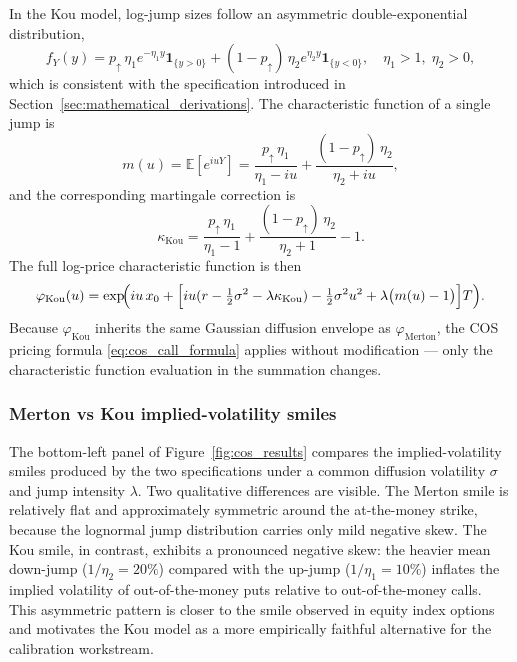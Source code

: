 \documentclass[12pt]{article}
\begin{document}
In the Kou model, log-jump sizes follow an asymmetric
double-exponential distribution,
\begin{equation}
  f_Y(y) = p_{\uparrow}\,\eta_1 e^{-\eta_1 y}\mathbf{1}_{\{y > 0\}}
           + (1-p_{\uparrow})\,\eta_2 e^{\eta_2 y}\mathbf{1}_{\{y < 0\}},
  \quad \eta_1 > 1,\; \eta_2 > 0,
\end{equation}
which is consistent with the specification introduced in
Section~\ref{sec:mathematical_derivations}. The characteristic function
of a single jump is
\begin{equation}
  m(u) = \mathbb{E}[e^{i u Y}]
       = \frac{p_{\uparrow}\,\eta_1}{\eta_1 - i u}
         + \frac{(1-p_{\uparrow})\,\eta_2}{\eta_2 + i u},
\end{equation}
and the corresponding martingale correction is
\begin{equation}
  \kappa_{\text{Kou}} = \frac{p_{\uparrow}\,\eta_1}{\eta_1-1}
        + \frac{(1-p_{\uparrow})\,\eta_2}{\eta_2+1} - 1.
\end{equation}
The full log-price characteristic function is then
\begin{equation}\label{eq:cos_kou_cf}
  \varphi_{\text{Kou}}(u)
  = \exp\!\Bigl(i u\,x_0
      + \Bigl[i u(r-\tfrac{1}{2}\sigma^2-\lambda\kappa_{\text{Kou}})
              - \tfrac{1}{2}\sigma^2 u^2 + \lambda\bigl(m(u)-1\bigr)\Bigr]T\Bigr).
\end{equation}
Because $\varphi_{\text{Kou}}$ inherits the same Gaussian diffusion
envelope as $\varphi_{\text{Merton}}$, the COS pricing formula
\eqref{eq:cos_call_formula} applies without modification --- only the
characteristic function evaluation in the summation changes.

\subsubsection*{Merton vs Kou implied-volatility smiles}

The bottom-left panel of Figure~\ref{fig:cos_results} compares the
implied-volatility smiles produced by the two specifications under a
common diffusion volatility $\sigma$ and jump intensity $\lambda$.
Two qualitative differences are visible. The Merton smile is
relatively flat and approximately symmetric around the at-the-money
strike, because the lognormal jump distribution carries only mild
negative skew. The Kou smile, in contrast, exhibits a pronounced
negative skew: the heavier mean down-jump
($1/\eta_2 = 20\%$) compared with the up-jump
($1/\eta_1 = 10\%$) inflates the implied volatility of
out-of-the-money puts relative to out-of-the-money calls. This
asymmetric pattern is closer to the smile observed in equity index
options and motivates the Kou model as a more empirically faithful
alternative for the calibration workstream.
\end{document}
